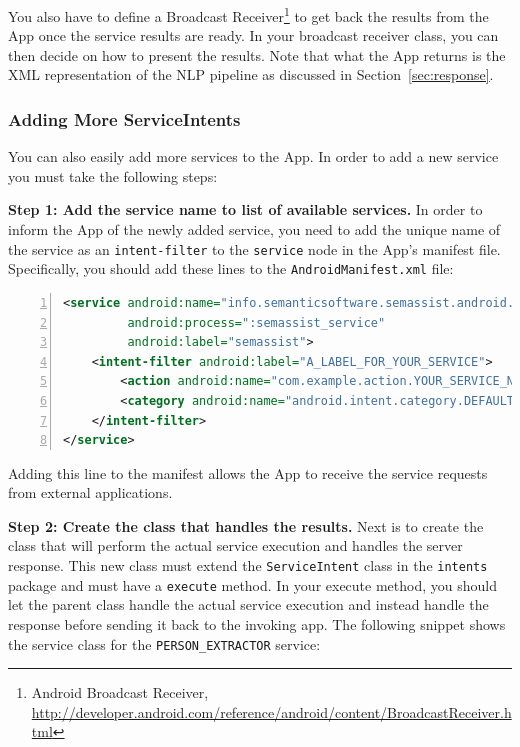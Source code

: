 You also have to define a Broadcast Receiver\footnote{Android Broadcast Receiver, \url{http://developer.android.com/reference/android/content/BroadcastReceiver.html}} to get back the results from the \sa App once the service results are ready. In your broadcast receiver class, you can then decide on how to present the results. Note that what the \sa App returns is the XML representation of the NLP pipeline as discussed in Section~\ref{sec:response}.

\subsubsection{Adding More ServiceIntents}
You can also easily add more services to the \sa App. In order to add a new service you must take the following steps:

\blankline
\noindent
\textbf{Step 1: Add the service name to list of available services. } In order to inform the \sa App of the newly added service, you need to add the unique name of the service as an \texttt{intent-filter} to the \texttt{service} node in the \sa App's manifest file. Specifically, you should add these lines to the \texttt{AndroidManifest.xml} file:

\begin{lstlisting}[language=XML,numbers=left,xleftmargin=4mm,columns=flexible]
<service android:name="info.semanticsoftware.semassist.android.service.SemanticAssistantsService"
		 android:process=":semassist_service" 
		 android:label="semassist">
	<intent-filter android:label="A_LABEL_FOR_YOUR_SERVICE">
		<action android:name="com.example.action.YOUR_SERVICE_NAME" />
		<category android:name="android.intent.category.DEFAULT" />
	</intent-filter>
</service>
\end{lstlisting}

Adding this line to the manifest allows the \sa App to receive the service requests from external applications.

\blankline
\noindent
\textbf{Step 2: Create the class that handles the results. }
Next is to create the class that will perform the actual service execution and handles the server response. This new class must extend the \texttt{ServiceIntent} class in the \texttt{intents} package and must have a \texttt{execute{}} method. In your execute method, you should let the parent class handle the actual service execution and instead handle the response before sending it back to the invoking app. The following snippet shows the service class for the \texttt{PERSON\_EXTRACTOR} service:

